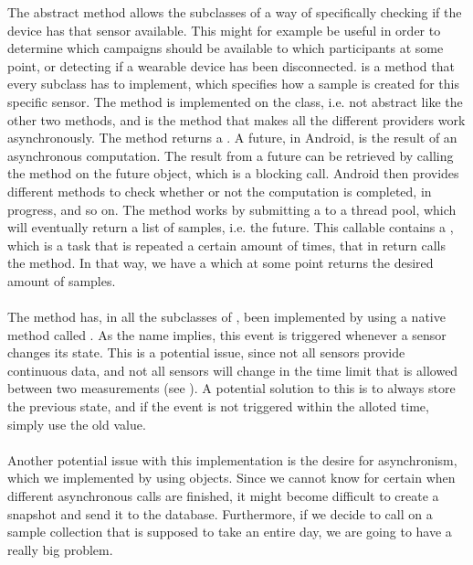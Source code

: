 The abstract  method allows the subclasses of  a way of specifically checking if the device has that sensor available. This might for example be useful in order to determine which campaigns should be available to which participants at some point, or detecting if a wearable device has been disconnected.  is a method that every subclass has to implement, which specifies how a sample is created for this specific sensor. The  method is implemented on the  class, i.e. not abstract like the other two methods, and is the method that makes all the different providers work asynchronously. The method returns a . A future, in Android, is the result of an asynchronous computation. The result from a future can be retrieved by calling the  method on the future object, which is a blocking call. Android then provides different methods to check whether or not the computation is completed, in progress, and so on. The method works by submitting a  to a thread pool, which will eventually return a list of samples, i.e. the future. This callable contains a , which is a task that is repeated a certain amount of times, that in return calls the  method. In that way, we have a  which at some point returns the desired amount of samples. 
\\\\
The  method has, in all the subclasses of , been implemented by using a native method called . As the name implies, this event is triggered whenever a sensor changes its state. This is a potential issue, since not all sensors provide continuous data, and not all sensors will change in the time limit that is allowed between two measurements (see ). A potential solution to this is to always store the previous state, and if the event is not triggered within the alloted time, simply use the old value. 
\\\\
Another potential issue with this implementation is the desire for asynchronism, which we implemented by using  objects. Since we cannot know for certain when different asynchronous calls are finished, it might become difficult to create a snapshot and send it to the database. Furthermore, if we decide to call  on a sample collection that is supposed to take an entire day, we are going to have a really big problem. 

% 
